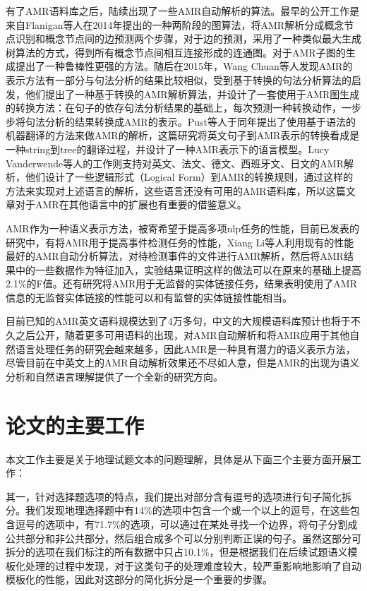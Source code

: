 \documentclass[master, winfont]{njuthesis}
\begin{document}
有了AMR语料库之后，陆续出现了一些AMR自动解析的算法。最早的公开工作是来自Flanigan等人\cite{Flanigan2014}在2014年提出的一种两阶段的图算法，将AMR解析分成概念节点识别和概念节点间的边预测两个步骤，对于边的预测，采用了一种类似最大生成树算法的方式，得到所有概念节点间相互连接形成的连通图。\cite{Angeli2014}对于AMR子图的生成提出了一种鲁棒性更强的方法。随后在2015年，Wang Chuan\cite{Wang2015}等人发现AMR的表示方法有一部分与句法分析的结果比较相似，受到基于转换的句法分析算法的启发，他们提出了一种基于转换的AMR解析算法，并设计了一套使用于AMR图生成的转换方法：在句子的依存句法分析结果的基础上，每次预测一种转换动作，一步步将句法分析的结果转换成AMR的表示。Pust等人\cite{Pust2015}于同年提出了使用基于语法的机器翻译的方法来做AMR的解析，这篇研究将英文句子到AMR表示的转换看成是一种string到tree的翻译过程，并设计了一种AMR表示下的语言模型。Lucy Vanderwende等人\cite{Vanderwende2015}的工作则支持对英文、法文、德文、西班牙文、日文的AMR解析，他们设计了一些逻辑形式（Logical Form）到AMR的转换规则，通过这样的方法来实现对上述语言的解析，这些语言还没有可用的AMR语料库，所以这篇文章对于AMR在其他语言中的扩展也有重要的借鉴意义。

AMR作为一种语义表示方法，被寄希望于提高多项nlp任务的性能，目前已发表的研究中，有将AMR用于提高事件检测任务的性能\cite{kai2015improving}，Xiang Li等人利用现有的性能最好的AMR自动分析算法，对待检测事件的文件进行AMR解析，然后将AMR结果中的一些数据作为特征加入，实验结果证明这样的做法可以在原来的基础上提高2.1\%的F值。还有研究将AMR用于无监督的实体链接任务\cite{Pan2015}，结果表明使用了AMR信息的无监督实体链接的性能可以和有监督的实体链接性能相当。

目前已知的AMR英文语料规模达到了4万多句，中文的大规模语料库预计也将于不久之后公开，随着更多可用语料的出现，对AMR自动解析和将AMR应用于其他自然语言处理任务的研究会越来越多，因此AMR是一种具有潜力的语义表示方法，尽管目前在中英文上的AMR自动解析效果还不尽如人意，但是AMR的出现为语义分析和自然语言理解提供了一个全新的研究方向。

\section{论文的主要工作}
本文工作主要是关于地理试题文本的问题理解，具体是从下面三个主要方面开展工作：

其一，针对选择题选项的特点，我们提出对部分含有逗号的选项进行句子简化拆分。我们发现地理选择题中有14\%的选项中包含一个或一个以上的逗号，在这些包含逗号的选项中，有71.7\%的选项，可以通过在某处寻找一个边界，将句子分割成公共部分和非公共部分，然后组合成多个可以分别判断正误的句子。虽然这部分可拆分的选项在我们标注的所有数据中只占10.1\%，但是根据我们在后续试题语义模板化处理的过程中发现，对于这类句子的处理难度较大，较严重影响地影响了自动模板化的性能，因此对这部分的简化拆分是一个重要的步骤。
\end{document}
